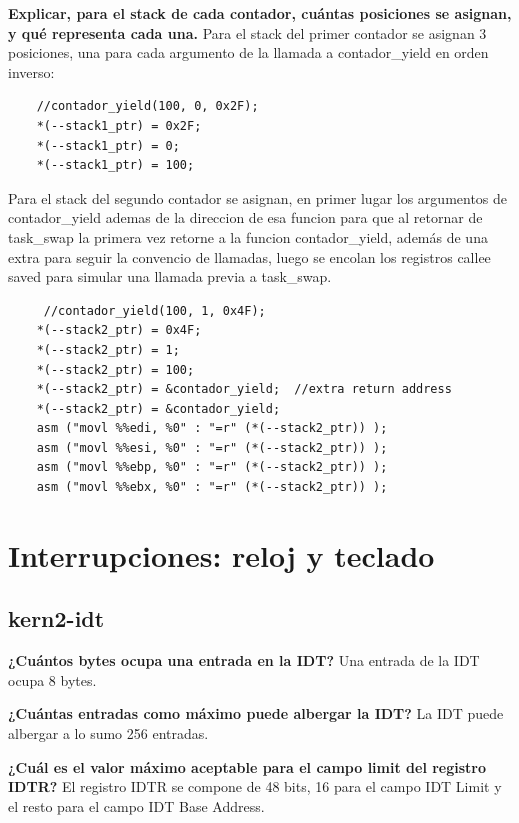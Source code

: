 \documentclass[a4paper]{article}
\begin{document}
\textbf{Explicar, para el stack de cada contador, cuántas posiciones se asignan, y qué representa cada una.}
\newline Para el stack del primer contador se asignan 3 posiciones, una para cada argumento de la llamada a contador\_yield en orden inverso:
\begin{lstlisting}
    //contador_yield(100, 0, 0x2F);
    *(--stack1_ptr) = 0x2F;
    *(--stack1_ptr) = 0;
    *(--stack1_ptr) = 100;
\end{lstlisting}
Para el stack del segundo contador se asignan, en primer lugar los argumentos de contador\_yield ademas de la direccion de esa funcion para que al retornar de task\_swap la primera vez retorne a la funcion contador\_yield, además de una extra para seguir la convencio de llamadas, luego se encolan los registros callee saved para simular una llamada previa a task\_swap. 
\begin{lstlisting}
     //contador_yield(100, 1, 0x4F);
    *(--stack2_ptr) = 0x4F;
    *(--stack2_ptr) = 1;
    *(--stack2_ptr) = 100;
    *(--stack2_ptr) = &contador_yield;  //extra return address  
    *(--stack2_ptr) = &contador_yield;
    asm ("movl %%edi, %0" : "=r" (*(--stack2_ptr)) );
    asm ("movl %%esi, %0" : "=r" (*(--stack2_ptr)) );
    asm ("movl %%ebp, %0" : "=r" (*(--stack2_ptr)) );
    asm ("movl %%ebx, %0" : "=r" (*(--stack2_ptr)) );
\end{lstlisting}

\newpage
\section{Interrupciones: reloj y teclado}

\subsection{kern2-idt}

\textbf{¿Cuántos bytes ocupa una entrada en la IDT?}\newline \newline
Una entrada de la IDT ocupa 8 bytes.

\textbf{¿Cuántas entradas como máximo puede albergar la IDT?}\newline \newline
La IDT puede albergar a lo sumo 256 entradas.

\textbf{¿Cuál es el valor máximo aceptable para el campo limit del registro IDTR?}\newline \newline
El registro IDTR se compone de 48 bits, 16 para el campo IDT Limit y el resto para el campo IDT Base Address.
\end{document}
